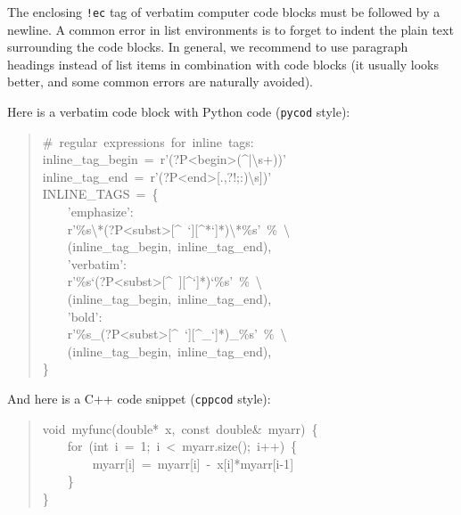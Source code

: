\documentclass[a4paper,english]{article}
\begin{document}


The enclosing \texttt{!ec} tag of verbatim computer code blocks must
be followed by a newline.  A common error in list environments is to
forget to indent the plain text surrounding the code blocks. In
general, we recommend to use paragraph headings instead of list items
in combination with code blocks (it usually looks better, and some
common errors are naturally avoided).

Here is a verbatim code block with Python code (\texttt{pycod} style):
%
\begin{quote}{\ttfamily \raggedright \noindent
\#~regular~expressions~for~inline~tags:\\
inline\_tag\_begin~=~r'(?P<begin>(\textasciicircum{}|\textbackslash{}s+))'\\
inline\_tag\_end~=~r'(?P<end>{[}.,?!;:)\textbackslash{}s{]})'\\
INLINE\_TAGS~=~\{\\
~~~~'emphasize':\\
~~~~r'\%s\textbackslash{}*(?P<subst>{[}\textasciicircum{}~`{]}{[}\textasciicircum{}*`{]}*)\textbackslash{}*\%s'~\%~\textbackslash{}\\
~~~~(inline\_tag\_begin,~inline\_tag\_end),\\
~~~~'verbatim':\\
~~~~r'\%s`(?P<subst>{[}\textasciicircum{}~{]}{[}\textasciicircum{}`{]}*)`\%s'~\%~\textbackslash{}\\
~~~~(inline\_tag\_begin,~inline\_tag\_end),\\
~~~~'bold':\\
~~~~r'\%s\_(?P<subst>{[}\textasciicircum{}~`{]}{[}\textasciicircum{}\_`{]}*)\_\%s'~\%~\textbackslash{}\\
~~~~(inline\_tag\_begin,~inline\_tag\_end),\\
\}
}
\end{quote}

And here is a C++ code snippet (\texttt{cppcod} style):
%
\begin{quote}{\ttfamily \raggedright \noindent
void~myfunc(double*~x,~const~double\&~myarr)~\{\\
~~~~for~(int~i~=~1;~i~<~myarr.size();~i++)~\{\\
~~~~~~~~myarr{[}i{]}~=~myarr{[}i{]}~-~x{[}i{]}*myarr{[}i-1{]}\\
~~~~\}\\
\}
}
\end{quote}
\end{document}
